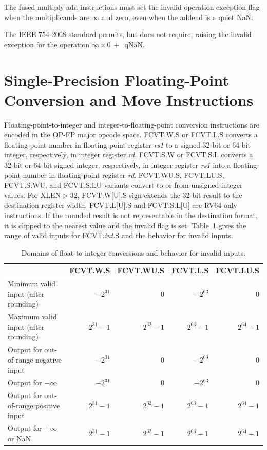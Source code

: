 The fused multiply-add instructions must set the invalid operation exception flag
when the multiplicands are $\infty$ and zero, even when the addend is a quiet
NaN.
\begin{commentary}
The IEEE 754-2008 standard permits, but does not require, raising the
invalid exception for the operation \mbox{$\infty\times 0\ +$ qNaN}.
\end{commentary}

\section{Single-Precision Floating-Point Conversion and Move \mbox{Instructions}}

Floating-point-to-integer and integer-to-floating-point conversion
instructions are encoded in the OP-FP major opcode space.
FCVT.W.S or FCVT.L.S converts a floating-point number
in floating-point register {\em rs1} to a signed 32-bit or 64-bit
integer, respectively, in integer register {\em rd}.  FCVT.S.W
or FCVT.S.L converts a 32-bit or 64-bit signed integer,
respectively, in integer register {\em rs1} into a floating-point
number in floating-point register {\em rd}. FCVT.WU.S,
FCVT.LU.S, FCVT.S.WU, and FCVT.S.LU variants
convert to or from unsigned integer values.
For XLEN$>32$, FCVT.W[U].S sign-extends the 32-bit result to the
destination register width.
FCVT.L[U].S and FCVT.S.L[U] are RV64-only instructions.
If the rounded result is not representable in the destination format,
it is clipped to the nearest value and the invalid flag is set.
Table~\ref{tab:int_conv} gives the range of valid inputs for FCVT.{\em int}.S
and the behavior for invalid inputs.

\begin{table}[htp]
\begin{small}
\begin{center}
\begin{tabular}{|l|r|r|r|r|}
\hline
 & FCVT.W.S & FCVT.WU.S & FCVT.L.S & FCVT.LU.S \\
\hline
Minimum valid input (after rounding) & $-2^{31}$ & 0 & $-2^{63}$ & 0 \\
Maximum valid input (after rounding) & $2^{31}-1$ & $2^{32}-1$ & $2^{63}-1$ & $2^{64}-1$ \\
\hline
Output for out-of-range negative input & $-2^{31}$ & 0 & $-2^{63}$ & 0 \\
Output for $-\infty$ & $-2^{31}$ & 0 & $-2^{63}$ & 0 \\
Output for out-of-range positive input & $2^{31}-1$ & $2^{32}-1$ & $2^{63}-1$ & $2^{64}-1$ \\
Output for $+\infty$ or NaN & $2^{31}-1$ & $2^{32}-1$ & $2^{63}-1$ & $2^{64}-1$ \\
\hline
\end{tabular}
\end{center}
\end{small}
\caption{Domains of float-to-integer conversions and behavior for invalid inputs.}
\label{tab:int_conv}
\end{table}

